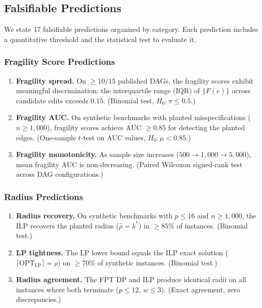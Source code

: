 \documentclass[11pt,a4paper]{article}
\theoremstyle{definition}
\theoremstyle{remark}
\newcommand{\fragility}{F}
\newcommand{\radius}{\rho}
\begin{document}
\subsection{Falsifiable Predictions}\label{sec:predictions}

We state 17 falsifiable predictions organized by category. Each prediction includes a
quantitative threshold and the statistical test to evaluate it.

\subsubsection{Fragility Score Predictions}

\begin{enumerate}[label=\textbf{P\arabic*:}]
\item \textbf{Fragility spread.} On $\geq 10/15$ published DAGs, the fragility scores
  exhibit meaningful discrimination: the interquartile range (IQR) of
  $\{\fragility(e)\}$ across candidate edits exceeds $0.15$. (Binomial test,
  $H_0: \pi \leq 0.5$.)

\item \textbf{Fragility AUC.} On synthetic benchmarks with planted misspecifications
  ($n \geq 1{,}000$), fragility scores achieve AUC $\geq 0.85$ for detecting the planted
  edges. (One-sample $t$-test on AUC values, $H_0: \mu < 0.85$.)

\item \textbf{Fragility monotonicity.} As sample size increases ($500 \to 1{,}000 \to
  5{,}000$), mean fragility AUC is non-decreasing. (Paired Wilcoxon signed-rank test
  across DAG configurations.)

\end{enumerate}

\subsubsection{Radius Predictions}

\begin{enumerate}[label=\textbf{P\arabic*:},resume]
\item \textbf{Radius recovery.} On synthetic benchmarks with $p \leq 16$ and $n \geq 1{,}000$,
  the ILP recovers the planted radius ($\hat\radius = k^*$) in $\geq 85\%$ of instances.
  (Binomial test.)

\item \textbf{LP tightness.} The LP lower bound equals the ILP exact solution
  ($\lceil\mathrm{OPT}_{\mathrm{LP}}\rceil = \radius$) on $\geq 70\%$ of synthetic instances.
  (Binomial test.)

\item \textbf{Radius agreement.} The FPT DP and ILP produce identical radii on all
  instances where both terminate ($p \leq 12$, $w \leq 3$). (Exact agreement, zero
  discrepancies.)

\end{enumerate}
\end{document}
